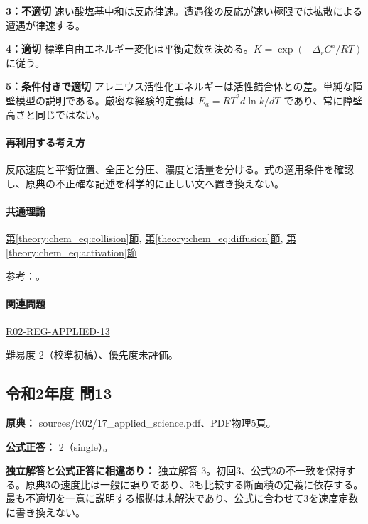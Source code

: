 \noindent\textbf{3：不適切} 速い酸塩基中和は反応律速。遭遇後の反応が速い極限では拡散による遭遇が律速する。\par

\noindent\textbf{4：適切} 標準自由エネルギー変化は平衡定数を決める。\(K=\exp(-\Delta_rG^\circ/RT)\) に従う。\par

\noindent\textbf{5：条件付きで適切} アレニウス活性化エネルギーは活性錯合体との差。単純な障壁模型の説明である。厳密な経験的定義は \(E_a=RT^2d\ln k/dT\) であり、常に障壁高さと同じではない。\par

\paragraph{再利用する考え方} 反応速度と平衡位置、全圧と分圧、濃度と活量を分ける。式の適用条件を確認し、原典の不正確な記述を科学的に正しい文へ置き換えない。

\paragraph{共通理論} \hyperref[theory:chem_eq:collision]{第\ref*{theory:chem_eq:collision}節}, \hyperref[theory:chem_eq:diffusion]{第\ref*{theory:chem_eq:diffusion}節}, \hyperref[theory:chem_eq:activation]{第\ref*{theory:chem_eq:activation}節}

\par 参考：\cite{iupac_greenbook2012}。

\paragraph{関連問題} \hyperref[q:r02-reg-applied-13]{R02-REG-APPLIED-13}

\par 難易度 2（校準初稿）、優先度未評価。

\subsection{令和2年度 問13}
\label{q:r02-reg-applied-13}

\noindent\textbf{原典：} sources/R02/17\_applied\_science.pdf、PDF物理5頁。

\textbf{公式正答：} 2（single）。

\par\textbf{独立解答と公式正答に相違あり：} 独立解答 3。初回3、公式2の不一致を保持する。原典3の速度比は一般に誤りであり、2も比較する断面積の定義に依存する。最も不適切を一意に説明する根拠は未解決であり、公式に合わせて3を速度定数に書き換えない。

